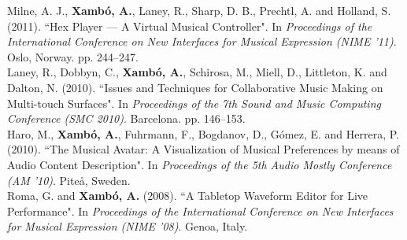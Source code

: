 \documentclass[10pt, a4paper]{article}
\newcommand{\years}[1]{\marginnote{\scriptsize #1}}
\begin{document}
\years{2011a}Milne, A. J., \textbf{Xambó, A.}, Laney, R., Sharp, D. B., Prechtl, A. and Holland, S. (2011). “Hex Player — A Virtual Musical Controller". In \emph{Proceedings of the International Conference on New Interfaces for Musical Expression (NIME '11)}. Oslo, Norway. pp. 244--247.\\
\years{2010b}Laney, R., Dobbyn, C., \textbf{Xambó, A.}, Schirosa, M., Miell, D., Littleton, K. and Dalton, N. (2010). “Issues and Techniques for Collaborative Music Making on Multi-touch Surfaces". In \emph{Proceedings of the 7th Sound and Music Computing Conference (SMC 2010)}. Barcelona. pp. 146–153.\\
\years{2010a}Haro, M., \textbf{Xambó, A.}, Fuhrmann, F., Bogdanov, D., Gómez, E. and Herrera, P. (2010). “The Musical Avatar: A Visualization of Musical Preferences by means of Audio Content Description". In \emph{Proceedings of the 5th Audio Mostly Conference (AM '10)}. Piteå, Sweden.\\
\years{2008}Roma, G. and \textbf{Xambó, A.} (2008). “A Tabletop Waveform Editor for Live Performance". In \emph{Proceedings of the International Conference on New Interfaces for Musical Expression (NIME '08)}. Genoa, Italy.
\end{document}
